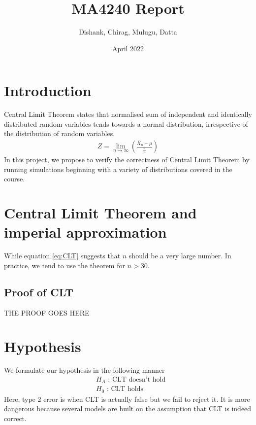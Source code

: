 \documentclass{article}
\title{MA4240 Report}
\author{Dishank, Chirag, Mulugu, Datta}
\date{April 2022}
\begin{document}
\maketitle

\section{Introduction}
Central Limit Theorem states that normalised sum of independent and identically distributed random variables tends towards a normal distribution, irrespective of the distribution of random variables.
\begin{align}
    Z = \lim_{n \to \infty} \left(\frac{\bar{X}_n-\mu}{\frac{\sigma}{n}}\right) \label{eq:CLT}
\end{align}
In this project, we propose to verify the correctness of Central Limit Theorem by running simulations beginning with a variety of distributions covered in the course.

\section{Central Limit Theorem and imperial approximation}
While equation \eqref{eq:CLT} suggests that $n$ should be a very large number. In practice, we tend to use the theorem for $n>30$. 
\subsection{Proof of CLT}
THE PROOF GOES HERE

\section{Hypothesis}
We formulate our hypothesis in the following manner
\begin{align}
    & H_A\text{ : CLT doesn't hold} \nonumber\\
    & H_0\text{ : CLT holds}\nonumber
\end{align}
Here, type 2 error is when CLT is actually false but we fail to reject it. It is more dangerous because several models are built on the assumption that CLT is indeed correct.
\end{document}
